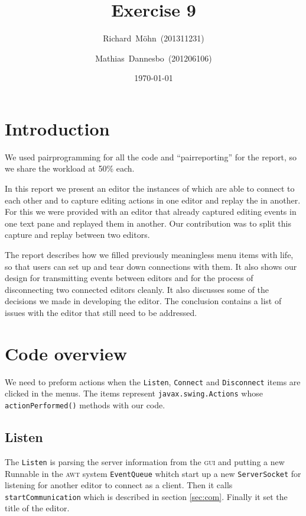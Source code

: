 \documentclass[a4paper,draft,12pt,oneside,article,table]{memoir}
\newcommand{\supertitle}[1]{\gdef\suP{#1}}
\newcommand{\subtitle}[1]{\gdef\suB{#1}}
\newcommand{\stunum}[1]{\gdef\stuN{#1}}
\newcommand{\mil}[1]{\texttt{#1}}
\begin{document}
\supertitle{Distributed Systems}
\title{Exercise 9}
\author{Richard~Möhn~\small{(201311231)} \and Mathias~Dannesbo~\small{(201206106)}}
\date{\today}
\maketitle

\chapter{Introduction}
We used pairprogramming for all the code and ``pairreporting'' for the
report, so we share the workload at 50\% each.

In this report we present an editor the instances of which are able to
connect to each other and to capture editing actions in one editor and
replay the in another. For this we were provided with an editor that
already captured editing events in one text pane and replayed them in
another. Our contribution was to split this capture and replay between
two editors.

The report describes how we filled previously meaningless menu items
with life, so that users can set up and tear down connections with them.
It also shows our design for transmitting events between editors and for
the process of disconnecting two connected editors cleanly. It also
discusses some of the decisions we made in developing the editor. The
conclusion contains a list of issues with the editor that still need to
be addressed.

\chapter{Code overview}
We need to preform actions when the \mil{Listen}, \mil{Connect} and
\mil{Disconnect} items are clicked in the menus. The items represent
\mil{javax.swing.Actions} whose \mil{actionPerformed()} methods with
our code.

\section{Listen}

The \mil{Listen} is parsing the server information from the
\textsc{gui} and putting a new Runnable in the \textsc{awt} system
\mil{EventQueue} whitch start up a new \mil{ServerSocket} for
listening for another editor to connect as a client. Then it calls
\mil{startCommunication} which is described in section
\ref{sec:com}. Finally it set the title of the editor.
\end{document}
